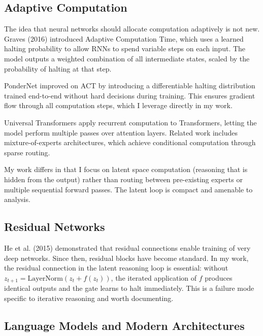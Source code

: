 \documentclass[11pt]{article}
\begin{document}
\subsection{Adaptive Computation}

The idea that neural networks should allocate computation adaptively is not new. Graves (2016) introduced Adaptive Computation Time\cite{Graves2016}, which uses a learned halting probability to allow RNNs to spend variable steps on each input. The model outputs a weighted combination of all intermediate states, scaled by the probability of halting at that step.

PonderNet\cite{Banino2021} improved on ACT by introducing a differentiable halting distribution trained end-to-end without hard decisions during training. This ensures gradient flow through all computation steps, which I leverage directly in my work.

Universal Transformers\cite{Dehghani2019} apply recurrent computation to Transformers, letting the model perform multiple passes over attention layers. Related work includes mixture-of-experts architectures\cite{Shazeer2021}\cite{Lewis2022}, which achieve conditional computation through sparse routing.

My work differs in that I focus on latent space computation (reasoning that is hidden from the output) rather than routing between pre-existing experts or multiple sequential forward passes. The latent loop is compact and amenable to analysis.

\subsection{Residual Networks}

He et al. (2015) demonstrated that residual connections enable training of very deep networks\cite{He2015}. Since then, residual blocks have become standard. In my work, the residual connection in the latent reasoning loop is essential: without $z_{t+1} = \text{LayerNorm}(z_t + f(z_t))$, the iterated application of $f$ produces identical outputs and the gate learns to halt immediately. This is a failure mode specific to iterative reasoning and worth documenting.

\subsection{Language Models and Modern Architectures}
\end{document}
